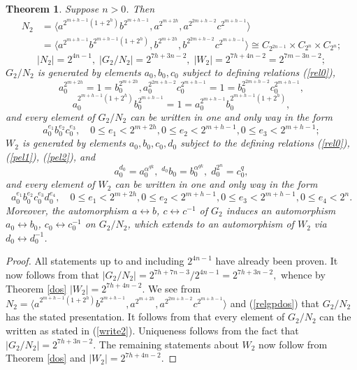 \documentclass{amsart}
\newtheorem{theorem}{Theorem}[section]
\theoremstyle{definition}
\theoremstyle{remark}
\begin{document}
{\begin{theorem}\label{main2} Suppose $n>0$. Then
$$
\begin{aligned}
N_2 &=\langle a^{2^{m+h-1}(1+2^h)} b^{2^{m+h-1}}, a^{2^{m+2h}}, a^{2^{2m+h-2}}c^{2^{m+h-1}}\rangle\\
&=\langle a^{2^{m+h-1}} b^{2^{m+h-1}(1+2^h)}, b^{2^{m+2h}}, b^{2^{2m+h-2}}c^{2^{m+h-1}}\rangle
\cong C_{2^{2n-1}}\times C_{2^n}\times C_{2^n};
\end{aligned}
$$
$$
|N_2|=2^{4n-1},\; |G_2/N_2|=2^{7h+3n-2},\; |W_2|=2^{7h+4n-2}=2^{7m-3n-2};
$$
$G_2/N_2$ is generated by elements $a_0,b_0,c_0$ subject to defining relations (\ref{rel0}),
\begin{equation}
\label{pel1}
a_0^{2^{m+2h}}=1=b_0^{2^{m+2h}}, a_0^{2^{2m+h-2}}c_0^{2^{m+h-1}}=1=b_0^{2^{2m+h-2}}c_0^{2^{m+h-1}},
\end{equation}
\begin{equation}
\label{pel2}
a_0^{2^{m+h-1}(1+2^h)}b_0^{2^{m+h-1}}=1=a_0^{2^{m+h-1}}b_0^{2^{m+h-1}(1+2^h)},
\end{equation}
and every element of $G_2/N_2$ can be written in one and only way in the form
\begin{equation}
\label{write2}
a_0^{e_1} b_0^{e_2}c_0^{e_3},\quad 0\leq e_1<2^{m+2h}, 0\leq e_2<2^{m+h-1}, 0\leq e_3<2^{m+h-1};
\end{equation}
$W_2$ is generated by elements $a_0,b_0,c_0,d_0$ subject to the defining relations (\ref{rel0}), (\ref{pel1}), (\ref{pel2}),
and
\begin{equation}
\label{pel3}
a_0^{d_0}=a_0^{\alpha^{qk}},\; {}^{d_0} b_0=b_0^{\alpha^{qk}},\; d_0^{2^n}=c_0^q,
\end{equation}
and every element of $W_2$ can be written in one and only way in the form
$$
a_0^{e_1} b_0^{e_2}c_0^{e_3}d_0^{e_4},\quad 0\leq e_1<2^{m+2h}, 0\leq e_2<2^{m+h-1}, 0\leq e_3<2^{m+h-1}, 0\leq e_4<2^{n}.
$$
Moreover, the automorphism $a\leftrightarrow b$, $c\leftrightarrow c^{-1}$ of $G_2$ induces an automorphism $a_0\leftrightarrow b_0$, 
$c_0\leftrightarrow c_0^{-1}$ on $G_2/N_2$, which extends to an automorphism of $W_2$ via $d_0\leftrightarrow d_0^{-1}$.
\end{theorem}

\begin{proof} All statements up to and including $2^{4n-1}$ have already been proven. It now follows from \cite[Theorem 7.1]{MS} that
$
|G_2/N_2|=2^{7h+7n-3}/2^{4n-1}= 2^{7h+3n-2},
$
whence by Theorem \ref{dos}
$
|W_2|=2^{7h+4n-2}.
$
We see from $N_2=\langle a^{2^{m+h-1}(1+2^h)} b^{2^{m+h-1}}, a^{2^{m+2h}}, a^{2^{2m+h-2}}c^{2^{m+h-1}}\rangle$ and (\ref{relgpdos}) that
$G_2/N_2$ has the stated presentation. It follows from \cite[Lemma 6.1 or Theorem 7.1]{MS} that every element
of $G_2/N_2$ can the written as stated in (\ref{write2}). Uniqueness follows from the fact that 
$|G_2/N_2|=2^{7h+3n-2}$. The remaining statements about $W_2$ now follow from Theorem \ref{dos} and $|W_2|=2^{7h+4n-2}$.
\end{proof}


}
\end{document}
